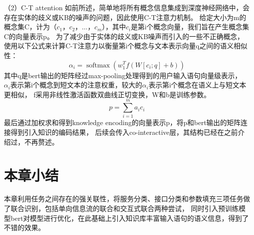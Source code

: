 （2）C-T attention
如前所述，简单地将所有概念信息集成到深度神经网络中，会存在实体的歧义或KB的噪声的问题，因此使用C-T注意力机制。
给定大小为m的概念集C，计为（$c_1$，$c_2$，$\dots$，$c_m$），其中$c_i$是第i个概念向量，我们旨在产生概念集C的向量表示p。 
为了减少由于实体的歧义或KB噪声而引入的一些不正确概念，使用以下公式来计算C-T注意力以衡量第i个概念与文本表示向量q之间的语义相似性：
\begin{equation}
\alpha_{i}=\operatorname{softmax}\left(w_{1}^{T} f\left(W\left[c_{i} ; q\right]+b\right)\right)
\end{equation}
其中q是bert输出的矩阵经过max-pooling处理得到的用户输入语句向量级表示，
$\alpha_{i}$表示第i个概念到短文本的注意权重，较大的$\alpha_{i}$表示第i个概念在语义上与短文本更相似，
f采用非线性激活函数双曲线正切变换，W和b是训练参数。
\begin{equation}
p=\sum_{i=1}^{m} a_{i} c_{i}
\end{equation}
最后通过加权求和得到knowledge encoding的向量表示p，将p和bert输出的矩阵连接得到引入知识的编码结果，
后续会传入co-interactive层，其结构已经在之前介绍过，不再赘述。

\section{本章小结}
本章利用任务之间存在的强关联性，将服务分类、接口分类和参数填充三项任务做了联合识别，包括单向信息流的联合和交互式联合两种尝试，
同时引入预训练模型bert对模型进行优化，在此基础上引入知识库丰富输入语句的语义信息，得到了不错的效果。
